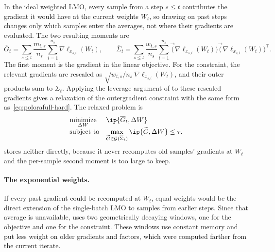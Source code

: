 In the ideal weighted LMO, every sample from a step $s\le t$ contributes
the gradient it would have at the current weights $W_t$, so drawing on past
steps changes only which samples enter the averages, not where their
gradients are evaluated. The two resulting moments are
\[
\overline G_t
  =
  \sum_{s\le t}\frac{m_{t,s}}{n_s}\sum_{i=1}^{n_s}
  \nabla\ell_{x_{s,i}}(W_t),
\qquad
\overline\Sigma_t
  =
  \sum_{s\le t}\frac{w_{t,s}}{n_s}\sum_{i=1}^{n_s}
  \vec(\nabla\ell_{x_{s,i}}(W_t))
  \vec(\nabla\ell_{x_{s,i}}(W_t))^\top .
\]
The first moment is the gradient in the linear objective. For the
constraint, the relevant gradients are rescaled as
$\sqrt{w_{t,s}/n_s}\,\nabla\ell_{x_{s,i}}(W_t)$, and their outer
products sum to $\overline\Sigma_t$. Applying the leverage argument of
 to these rescaled gradients gives a relaxation of
the outergradient constraint with the same form
as~\eqref{eq:polorafull-hard}. The relaxed problem is
\begin{equation}\label{eq:weighted-relaxed-h3}
 \begin{array}{ll}
  \underset{\Delta W}{\mathrm{minimize}} &
  \ip{\overline G_t, \Delta W} \\[2pt]
  \mbox{subject to} &
  \displaystyle
  \max_{\widetilde{G}\in\mathcal{G}(\overline\Sigma_t)}
  \ip{\widetilde{G},\Delta W}\le\tau .
  \end{array}
\end{equation}
 stores neither directly, because it never recomputes old
samples' gradients at $W_t$ and the per-sample second moment is too large
to keep.

\paragraph{The exponential weights.}
If every past gradient could be recomputed at $W_t$, equal weights would be
the direct extension of the single-batch LMO to samples from earlier steps.
Since that average is unavailable,  uses two geometrically decaying windows,
one for the objective and one for the constraint. These windows use
constant memory and put less weight on older gradients and factors, which
were computed farther from the current iterate.

